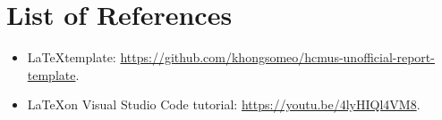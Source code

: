 \section{List of References}
\label{sec:references-list}

\begin{itemize}
    \item \LaTeX \space template: \url{https://github.com/khongsomeo/hcmus-unofficial-report-template}.
    \item \LaTeX \space on Visual Studio Code tutorial: \url{https://youtu.be/4lyHIQl4VM8}.
\end{itemize}